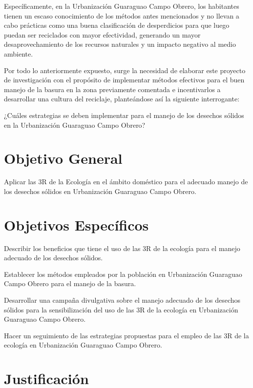Específicamente, en la Urbanización Guaraguao Campo Obrero, los habitantes tienen un escaso conocimiento de los métodos antes mencionados y no llevan a cabo prácticas como una buena clasificación de desperdicios para que luego puedan ser reciclados con mayor efectividad, generando un mayor desaprovechamiento de los recursos naturales y un impacto negativo al medio ambiente. 

Por todo lo anteriormente expuesto, surge la necesidad de elaborar este proyecto de investigación con el propósito de implementar métodos efectivos para el buen manejo de la basura en la zona previamente comentada e incentivarlos a desarrollar una cultura del reciclaje, planteándose así la siguiente interrogante:

¿Cuáles estrategias se deben implementar para el manejo de los desechos sólidos en la Urbanización Guaraguao Campo Obrero?

\newpage

\section{Objetivo General}

Aplicar las 3R de la Ecología en el ámbito doméstico para el adecuado manejo de los desechos sólidos en Urbanización Guaraguao Campo Obrero.

\section{Objetivos Específicos}

Describir los beneficios que tiene el uso de las 3R de la ecología para el manejo adecuado de los desechos sólidos.

Establecer los métodos empleados por la población en Urbanización Guaraguao Campo Obrero para el manejo de la basura.

Desarrollar una campaña divulgativa sobre el manejo adecuado de los desechos sólidos para la sensibilización del uso de las 3R de la ecología en Urbanización Guaraguao Campo Obrero.

Hacer un seguimiento de las estrategias propuestas para el empleo de las 3R de la ecología en Urbanización Guaraguao Campo Obrero.

\newpage

\section{Justificación}

